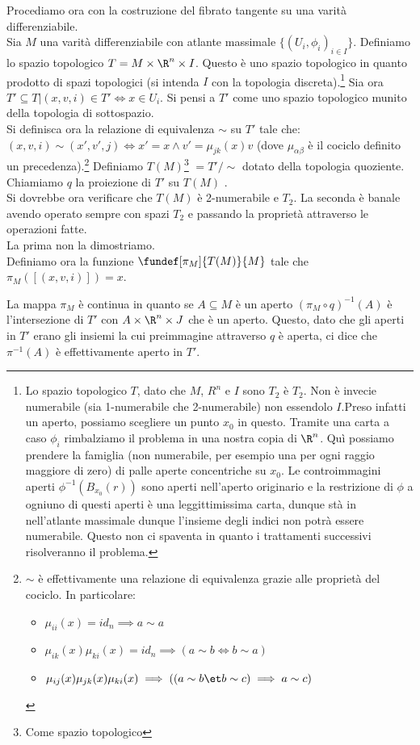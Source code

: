Procediamo ora con la costruzione del fibrato tangente su una varità differenziabile.\\
Sia $M$ una varità differenziabile con atlante massimale $\{(U_i, \phi_i)_{i\in I}\}$. Definiamo lo spazio topologico $T = M \times \R^n \times I$. Questo è uno spazio topologico in quanto prodotto di spazi topologici (si intenda $I$ con la topologia discreta).\footnote{
Lo spazio topologico $T$, dato che $M$, $R^n$ e $I$ sono $T_2$ è $T_2$. Non è invecie numerabile (sia 1-numerabile che 2-numerabile) non essendolo $I$.Preso infatti un aperto, possiamo scegliere un punto $x_0$ in questo. Tramite una carta a caso $\phi_i$ rimbalziamo il problema in una nostra copia di $\R^n$. Quì possiamo prendere la famiglia (non numerabile, per esempio una per ogni raggio maggiore di zero) di palle aperte concentriche su $x_0$. Le controimmagini aperti $\phi^{-1}(B_{x_0}(r))$ sono aperti nell'aperto originario e la restrizione di $\phi$ a ogniuno di questi aperti è una leggittimissima carta, dunque stà in  nell'atlante massimale dunque l'insieme degli indici non potrà essere numerabile. Questo non ci spaventa in quanto i trattamenti successivi risolveranno il problema. 
}
Sia ora $T'\subseteq T | (x, v, i)\in T' \iff x\in U_i$. Si pensi a $T'$ come uno spazio topologico munito della topologia di sottospazio.\\
Si definisca ora la relazione di equivalenza $\sim$ su  $T'$ tale che: $(x, v, i)\sim(x',v',j)\iff x'=x \land v'=\mu_{jk}(x)v$ (dove $\mu_{\alpha\beta}$ è il cociclo definito un precedenza).\footnote{
$\sim$ è effettivamente una relazione di equivalenza grazie alle proprietà del cociclo. In particolare:
\begin{itemize}
\item $\mu_{ii}(x)=id_n \implies a\sim a$
\item $\mu_{ik}(x)\mu_{ki}(x)=id_n \implies (a\sim b \iff b\sim a)$
\item $\mu_{ij}(x)\mu_{jk}(x)\mu_{ki}(x) \implies ((a\sim b \et b\sim c) \implies a\sim c)$
\end{itemize}
}
Definiamo $T(M)$\footnote{Come spazio topologico} $=T'/\sim$ dotato della topologia quoziente. Chiamiamo $q$ la proiezione di $T'$ su $T(M)$ .\\
Si dovrebbe ora verificare che $T(M)$ è 2-numerabile e $T_2$. La seconda è banale avendo operato sempre con spazi $T_2$ e passando la proprietà attraverso le operazioni fatte.\\ La prima non la dimostriamo.\\
Definiamo ora la funzione $\fundef[\pi_M]{T(M)}{M}$ tale che $\pi_M([(x, v, i)])=x$. 
\begin{oss}
La mappa $\pi_M$ è continua in quanto se $A\subseteq M$ è un aperto $(\pi_M\circ q)^{-1}(A)$ è l'intersezione di $T'$ con $A\times \R^n \times J$ che è un aperto. Questo, dato che gli aperti in $T'$ erano gli insiemi la cui preimmagine attraverso $q$ è aperta, ci dice che $\pi^{-1}(A)$ è effettivamente aperto in $T'$.
\end{oss}



